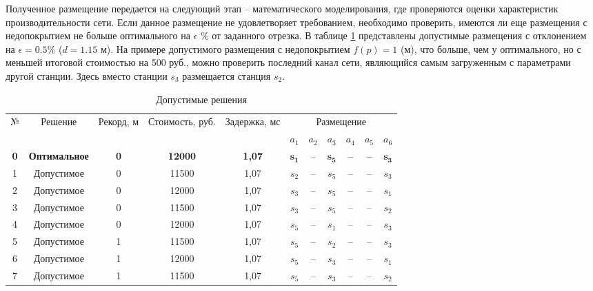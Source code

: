 Полученное размещение передается на следующий этап – математического моделирования, где проверяются оценки характеристик производительности сети. Если данное размещение не удовлетворяет требованием, необходимо проверить, имеются ли еще размещения с недопокрытием не больше оптимального на $\epsilon$ $\%$ от заданного отрезка. В таблице \cref{tab:part4_bnb_feasible_result} представлены допустимые размещения с отклонением на $\epsilon = 0.5 \% $ ($d = 1.15$ м). На примере допустимого размещения  с недопокрытием $f(p) = 1 $ (м), что больше, чем у оптимального, но с меньшей итоговой стоимостью на 500 руб., можно проверить последний канал сети, являющийся самым загруженным с параметрами другой станции. Здесь вместо станции $s_3$ размещается станция $s_2$.



\begin{table}[h!]\centering
  \begin{tabular}{| c | c | c | c | c | c  c  c  c  c  c |}
    \hline
    \multirow{2}{0.02\textwidth}{№} & \multirow{2}{0.15\textwidth}{Решение} & \multirow{2}{0.1\textwidth}{Рекорд, м} & \multirow{2}{0.135\textwidth}{Стоимость, руб.} & \multirow{2}{0.13\textwidth}{Задержка, мс} & \multicolumn{6}{|c|}{Размещение} \\\cline{6-11}

    &&&&& $a_1$&	$a_2$&	$a_3$&	$a_4$&	$a_5$&	$a_6$\\
    \hline
    \textbf{0}&	\textbf{Оптимальное}& \textbf{0}&	\textbf{12000}&	\textbf{1,07}& 	$\mathbf{s_1}$&	--&	$\mathbf{s_5}$& 	\textbf{--}& \textbf{--}&	$\mathbf{s_3}$ \\
    \hline
    1&	Допустимое& 0&	11500&	1,07& 	$s_2$&	--&	$s_5$& 	--& --&	$s_3$ \\
    2&	Допустимое& 0&	12000&	1,07& 	$s_3$&	--&	$s_5$& 	--& --&	$s_1$ \\
    3&	Допустимое& 0&	11500&	1,07& 	$s_3$&	--&	$s_5$& 	--& --&	$s_2$ \\
    4&	Допустимое& 0&	12000&	1,07& 	$s_5$&	--&	$s_1$& 	--& --&	$s_3$ \\
    5&	Допустимое& 1&	11500&	1,07& 	$s_5$&	--&	$s_2$& 	--& --&	$s_3$ \\
    6&	Допустимое& 1&	12000&	1,07& 	$s_5$&	--&	$s_3$& 	--& --&	$s_1$ \\
    7&	Допустимое& 1& 11500&	1,07& 	$s_5$&	--&	$s_3$& 	--& --&	$s_2$ \\
    \hline 
    
  \end{tabular}\caption{Допустимые решения}\label{tab:part4_bnb_feasible_result}
\end{table}
\normalsize

